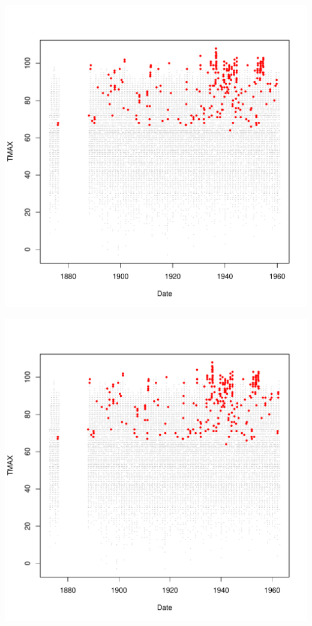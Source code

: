 \documentclass{article}\usepackage[]{graphicx}\usepackage[]{color}
\makeatletter
\def\maxwidth{ %
  \ifdim\Gin@nat@width>\linewidth
    \linewidth
  \else
    \Gin@nat@width
  \fi
}
\newenvironment{knitrout}{}{} %
\makeatother
\begin{document}
\begin{knitrout}
\includegraphics[width=\maxwidth]{figure/unnamed-chunk-4-40} 

\includegraphics[width=\maxwidth]{figure/unnamed-chunk-4-41} 


\end{knitrout}
\end{document}
